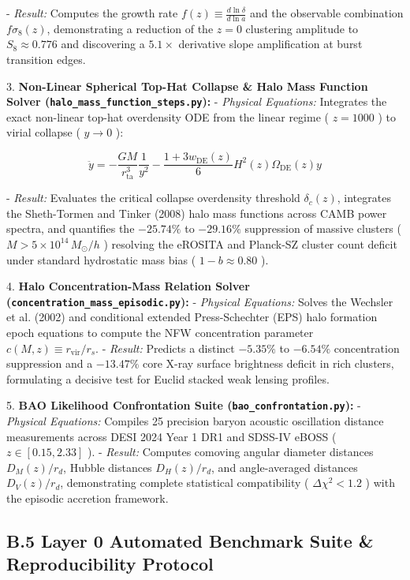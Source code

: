\documentclass[11pt,a4paper]{article}
\theoremstyle{definition}\newtheorem{definition}{Definition}
\theoremstyle{remark}\newtheorem{remark}{Remark}
\begin{document}
- \textit{Result:} Computes the growth rate $f(z) \equiv \frac{d\ln\delta}{d\ln a}$ and the observable combination $f\sigma_8(z)$, demonstrating a reduction of the $z=0$ clustering amplitude to $S_8 \approx 0.776$ and discovering a $5.1\times$ derivative slope amplification at burst transition edges.

3. \textbf{Non-Linear Spherical Top-Hat Collapse \& Halo Mass Function Solver (\texttt{halo_mass_function_steps.py}):}
- \textit{Physical Equations:} Integrates the exact non-linear top-hat overdensity ODE from the linear regime ( $z = 1000$ ) to virial collapse ( $y \to 0$ ):


\begin{equation}
\ddot{y} = -\frac{GM}{r_{\text{ta}}^3} \frac{1}{y^2} - \frac{1+3w_{\text{DE}}(z)}{6} H^2(z) \Omega_{\text{DE}}(z) y
\end{equation}


- \textit{Result:} Evaluates the critical collapse overdensity threshold $\delta_c(z)$, integrates the Sheth-Tormen and Tinker (2008) halo mass functions across CAMB power spectra, and quantifies the $-25.74\%$ to $-29.16\%$ suppression of massive clusters ( $M > 5 \times 10^{14} \, M_\odot/h$ ) resolving the eROSITA and Planck-SZ cluster count deficit under standard hydrostatic mass bias ( $1-b \approx 0.80$ ).

4. \textbf{Halo Concentration-Mass Relation Solver (\texttt{concentration_mass_episodic.py}):}
- \textit{Physical Equations:} Solves the Wechsler et al. (2002) and conditional extended Press-Schechter (EPS) halo formation epoch equations to compute the NFW concentration parameter $c(M, z) \equiv r_{\text{vir}} / r_s$.
- \textit{Result:} Predicts a distinct $-5.35\%$ to $-6.54\%$ concentration suppression and a $-13.47\%$ core X-ray surface brightness deficit in rich clusters, formulating a decisive test for Euclid stacked weak lensing profiles.

5. \textbf{BAO Likelihood Confrontation Suite (\texttt{bao_confrontation.py}):}
- \textit{Physical Equations:} Compiles 25 precision baryon acoustic oscillation distance measurements across DESI 2024 Year 1 DR1 and SDSS-IV eBOSS ( $z \in [0.15, 2.33]$ ).
- \textit{Result:} Computes comoving angular diameter distances $D_M(z)/r_d$, Hubble distances $D_H(z)/r_d$, and angle-averaged distances $D_V(z)/r_d$, demonstrating complete statistical compatibility ( $\Delta\chi^2 < 1.2$ ) with the episodic accretion framework.
\subsection{B.5 Layer 0 Automated Benchmark Suite \& Reproducibility Protocol}
\end{document}

